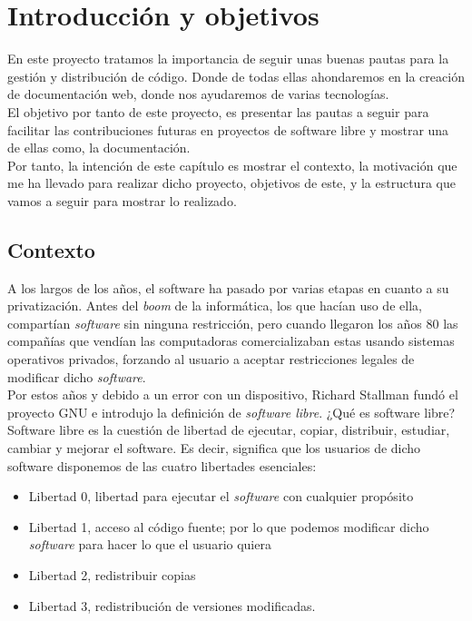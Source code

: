 \documentclass[a4paper, 12pt]{book}
\begin{document}
\tableofcontents

\chapter{Introducción y objetivos}
\label{chap:intro}
En este proyecto tratamos la importancia de seguir unas buenas pautas para la gestión y distribución de código. Donde de todas ellas ahondaremos en la creación de documentación web, donde nos ayudaremos de varias tecnologías. \\
El objetivo por tanto de este proyecto, es presentar las pautas a seguir para facilitar las contribuciones futuras en proyectos de software libre y mostrar una de ellas como, la documentación. \\
Por tanto, la intención de este capítulo es mostrar el contexto, la motivación que  me ha llevado para realizar dicho proyecto, objetivos de este, y la estructura que vamos a seguir para mostrar lo realizado.

\section{Contexto}
\label{sec:contex}
A los largos de los años, el software ha pasado por varias etapas en cuanto a su privatización. Antes del \emph{boom} de la informática, los que hacían uso de ella, compartían \emph{software} sin ninguna restricción, pero cuando llegaron los años 80 las compañías que vendían las computadoras comercializaban estas usando sistemas operativos privados, forzando al usuario a aceptar restricciones legales de modificar dicho \emph{software}.\\ 
Por estos años y debido a un error con un dispositivo, Richard Stallman fundó el proyecto GNU e introdujo la definición de \emph{software libre}. ¿Qué es software libre? Software libre es la cuestión de libertad de ejecutar, copiar, distribuir, estudiar, cambiar y mejorar el software.
\newpage
Es decir, significa que los usuarios de dicho software disponemos de las cuatro libertades esenciales: 
\begin{itemize}
    \item Libertad 0, libertad para ejecutar el \emph{software} con cualquier propósito
    \item Libertad 1, acceso al código fuente; por lo que podemos modificar dicho \emph{software} para hacer lo que el usuario quiera
    \item Libertad 2, redistribuir copias 
    \item Libertad 3, redistribución de versiones modificadas.
\end{itemize}
\end{document}
